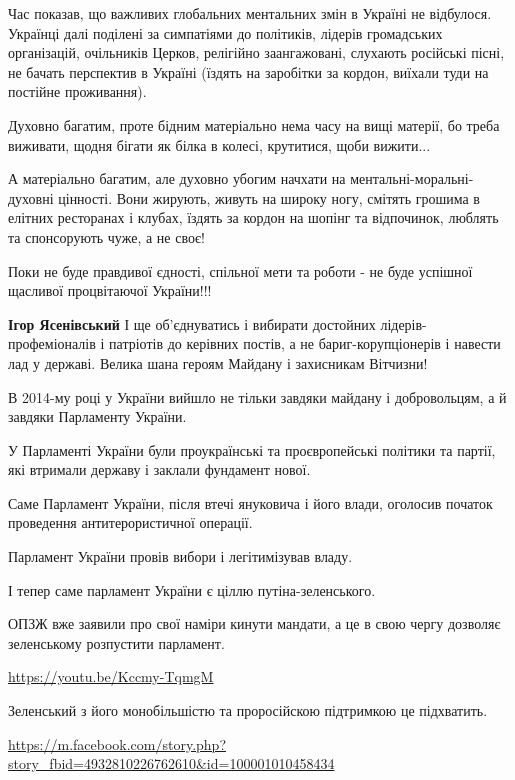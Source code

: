 \begin{itemize}
Час показав, що важливих глобальних ментальних змін в Україні не відбулося.
Українці далі поділені за симпатіями до політиків, лідерів громадських
організацій, очільників Церков, релігійно заангажовані, слухають російські
пісні, не бачать перспектив в Україні (їздять на заробітки за кордон, виїхали
туди на постійне проживання). 

Духовно багатим, проте бідним матеріально нема часу на вищі матерії, бо треба
виживати, щодня бігати як білка в колесі, крутитися, щоби вижити... 

А матеріально багатим, але духовно убогим начхати на ментальні-моральні-духовні
цінності. Вони жирують, живуть на широку ногу, смітять грошима в елітних
ресторанах і клубах, їздять за кордон на шопінг та відпочинок, люблять та
спонсорують чуже, а не своє! 

Поки не буде правдивої єдності, спільної мети та роботи - не буде успішної
щасливої процвітаючої України!!!

\begin{itemize} %
\textbf{Ігор Ясенівський} І ще об'єднуватись і вибирати достойних лідерів-профеміоналів і патріотів до керівних постів, а не бариг-корупціонерів і навести лад у державі. Велика шана героям Майдану і захисникам Вітчизни!
\end{itemize} %


В 2014-му році у України вийшло не тільки завдяки майдану і добровольцям, а й
завдяки Парламенту України.

У Парламенті України були проукраїнські та проєвропейські політики та партії,
які втримали державу і заклали фундамент нової.

Саме Парламент України, після втечі януковича і його влади, оголосив початок
проведення антитерористичної операції.

Парламент України провів вибори і легітимізував владу.

І тепер саме парламент України є ціллю путіна-зеленського.

ОПЗЖ вже заявили про свої наміри кинути мандати, а це в свою чергу дозволяє
зеленському розпустити парламент.

\url{https://youtu.be/Kccmy-TqmgM}

Зеленський з його монобільшістю та проросійскою підтримкою це підхватить.

\url{https://m.facebook.com/story.php?story_fbid=4932810226762610&id=100001010458434}


\end{itemize}
